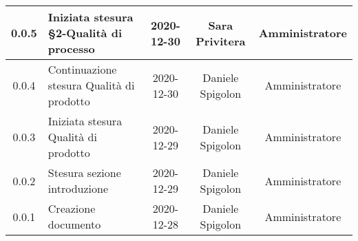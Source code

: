 \begin{center}
\begin{longtable}{|c|p{5cm}|c|c|c|}
	\hline
	0.0.5 & Iniziata stesura §2-Qualità di processo & 2020-12-30 & Sara Privitera & Amministratore \\
	\hline
	0.0.4 & Continuazione stesura Qualità di prodotto & 2020-12-30 & Daniele Spigolon & Amministratore \\
	\hline
	0.0.3 & Iniziata stesura Qualità di prodotto & 2020-12-29 & Daniele Spigolon & Amministratore \\
	\hline
	0.0.2 & Stesura sezione introduzione & 2020-12-29 & Daniele Spigolon & Amministratore \\
	\hline
	0.0.1 & Creazione documento & 2020-12-28 & Daniele Spigolon & Amministratore \\
	\hline

	\end{longtable}
\end{center}
